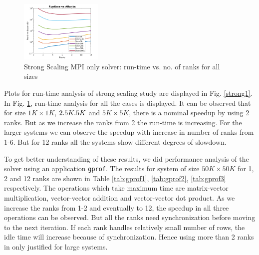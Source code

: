 \documentclass[sigplan,screen]{acmart}
\begin{document}
\begin{figure}[h!]
	\begin{center}
		\includegraphics[width=0.35\textwidth]{plots/MPI_strong_allranks_log.png}
	\end{center}
	\caption{Strong Scaling MPI only solver: run-time vs. no. of ranks for all sizes}
	\label{strong2}      
\end{figure}

Plots for run-time analysis of strong scaling study are displayed in Fig. \ref{strong1}. In Fig. \ref{strong2}, run-time analysis for all the cases is displayed. It can be observed that for size $1K\times 1K$, $2.5K\time 2.5K$ and $5K\times 5K$, there is a nominal speedup by using 2 ranks. But as we increase the ranks from 2 the run-time is increasing. For the larger systems we can observe the speedup with increase in number of ranks from 1-6. But for 12 ranks all the systems show different degrees of slowdown. 

To get better understanding of these results, we did performance analysis of the solver using an application \texttt{gprof}. The results for system of size $50K\times 50K$ for 1, 2 and 12 ranks are shown in Table \ref{tab:gprof1}, \ref{tab:gprof2}, \ref{tab:gprof3} respectively. The operations which take maximum time are matrix-vector multiplication, vector-vector addition and vector-vector dot product. As we increase the ranks from 1-2 and eventually to 12, the speedup in all three operations can be observed. But all the ranks need synchronization before moving to the next iteration. If each rank handles relatively small number of rows, the idle time will increase because of synchronization. Hence using more than 2 ranks in only justified for large systems. 
\end{document}
